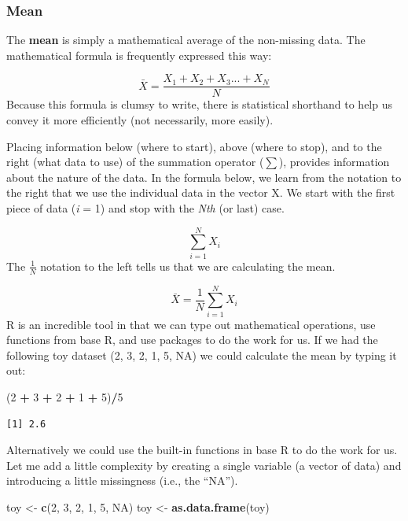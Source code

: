 \documentclass[
  11pt,
]{book}
\newenvironment{Shaded}{\begin{snugshade}}{\end{snugshade}}
\newcommand{\ConstantTok}[1]{\textcolor[rgb]{0.37,0.37,0.37}{#1}}
\newcommand{\DecValTok}[1]{\textcolor[rgb]{0.06,0.06,0.06}{#1}}
\newcommand{\FunctionTok}[1]{\textcolor[rgb]{0.27,0.27,0.27}{\textbf{#1}}}
\newcommand{\NormalTok}[1]{#1}
\newcommand{\OtherTok}[1]{\textcolor[rgb]{0.37,0.37,0.37}{#1}}
\newcommand{\SpecialCharTok}[1]{\textcolor[rgb]{0.43,0.43,0.43}{\textbf{#1}}}
\begin{document}
\hypertarget{mean}{%
\subsubsection{Mean}\label{mean}}

The \textbf{mean} is simply a mathematical average of the non-missing data. The mathematical formula is frequently expressed this way:

\[\bar{X} = \frac{X_{1} + X_{2} + X_{3}...+ X_{N}}{N}\] Because this formula is clumsy to write, there is statistical shorthand to help us convey it more efficiently (not necessarily, more easily).

Placing information below (where to start), above (where to stop), and to the right (what data to use) of the summation operator (\(\sum\)), provides information about the nature of the data. In the formula below, we learn from the notation to the right that we use the individual data in the vector X. We start with the first piece of data (\emph{i} = 1) and stop with the \emph{Nth} (or last) case.

\[\sum_{i=1}^{N}X_{i}\] The \(\frac{1}{N}\) notation to the left tells us that we are calculating the mean.

\[\bar{X}=\frac{1}{N}\sum_{i=1}^{N}X_{i}\] R is an incredible tool in that we can type out mathematical operations, use functions from base R, and use packages to do the work for us. If we had the following toy dataset (2, 3, 2, 1, 5, NA) we could calculate the mean by typing it out:

\begin{Shaded}
\begin{Highlighting}[]
\NormalTok{(}\DecValTok{2} \SpecialCharTok{+} \DecValTok{3} \SpecialCharTok{+} \DecValTok{2} \SpecialCharTok{+} \DecValTok{1} \SpecialCharTok{+} \DecValTok{5}\NormalTok{)}\SpecialCharTok{/}\DecValTok{5}
\end{Highlighting}
\end{Shaded}

\begin{verbatim}
[1] 2.6
\end{verbatim}

Alternatively we could use the built-in functions in base R to do the work for us. Let me add a little complexity by creating a single variable (a vector of data) and introducing a little missingness (i.e., the ``NA'').

\begin{Shaded}
\begin{Highlighting}[]
\NormalTok{toy }\OtherTok{\textless{}{-}} \FunctionTok{c}\NormalTok{(}\DecValTok{2}\NormalTok{, }\DecValTok{3}\NormalTok{, }\DecValTok{2}\NormalTok{, }\DecValTok{1}\NormalTok{, }\DecValTok{5}\NormalTok{, }\ConstantTok{NA}\NormalTok{)}
\NormalTok{toy }\OtherTok{\textless{}{-}} \FunctionTok{as.data.frame}\NormalTok{(toy)}
\end{Highlighting}
\end{Shaded}
\end{document}
